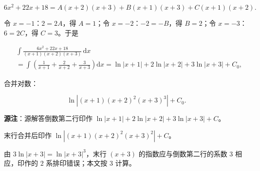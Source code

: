 \begin{answer}
\nopagebreak[4]
\[
6x^2+22x+18=A(x+2)(x+3)+B(x+1)(x+3)+C(x+1)(x+2).
\]

令 $x=-1$：$2=2A$，得 $A=1$；令 $x=-2$：$-2=-B$，得 $B=2$；令 $x=-3$：$6=2C$，得 $C=3$。于是

\nopagebreak[4]
\[
\begin{aligned}
&\int\frac{6x^2+22x+18}{(x+1)(x+2)(x+3)}\,\mathrm dx\\
&=\int\left(\frac1{x+1}+\frac2{x+2}+\frac3{x+3}\right)\mathrm dx
=\ln|x+1|+2\ln|x+2|+3\ln|x+3|+C_0,
\end{aligned}
\]

合并对数：

\nopagebreak[4]
\[
\ln\left|(x+1)(x+2)^2(x+3)^3\right|+C_0.
\]

\begin{gktip}
\textbf{源注}：源解答倒数第二行印作 $\ln|x+1|+2\ln|x+2|+3\ln|x+3|+C$。

末行合并后印作 $\ln\left|(x+1)(x+2)^2(x+3)^2\right|+C$。

由 $3\ln|x+3|=\ln|x+3|^3$，末行 $(x+3)$ 的指数应与倒数第二行的系数 $3$ 相应，印作的 $2$ 系排印错误；本文按 $3$ 计算。
\end{gktip}


\end{answer}